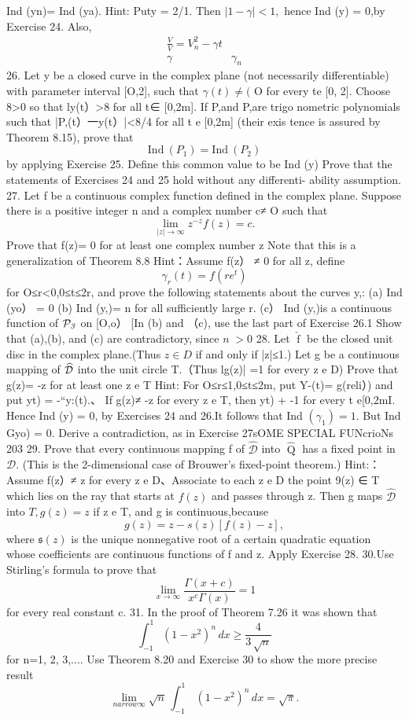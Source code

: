 Ind (yn)= Ind (ya). Hint: Puty = 2/1. Then $|1-\gamma|<1,$ hence Ind (y) = 0,by Exercise 24. Also, $$ \begin{array}{l}{{\frac{V}{V}=V_{n}^{2}-\gamma t}}\\ {{\gamma}}&{{\gamma_{n}}}\end{array} $$ 26. Let y be a closed curve in the complex plane (not necessarily differentiable) with parameter interval [O,2], such that $\gamma(t)\neq($ O for every te [0, 2]. Choose 8>0 so that ly(t）>8 for all t∈ [0,2m]. If P,and P,are trigo nometric polynomials such that |P,(t）一y(t）|<8/4 for all t e [0,2m] (their exis tence is assured by Theorem 8.15), prove that $$ {\mathrm{Ind~}}(P_{1})={\mathrm{Ind~}}(P_{2}) $$ by applying Exercise 25. Define this common value to be Ind (y) Prove that the statements of Exercises 24 and 25 hold without any differenti- ability assumption. 27. Let f be a continuous complex function defined in the complex plane. Suppose there is a positive integer n and a complex number c≠ O such that $$ \operatorname*{lim}_{|z|\to\infty}z^{-z}f(z)=c. $$ Prove that f(z)= 0 for at least one complex number z Note that this is a generalization of Theorem 8.8 Hint：Assume f(z） ≠ 0 for all z, define $$ \gamma_{r}(t)=f(r e^{t}) $$ for O≤r<0,0≤t≤2r, and prove the following statements about the curves y,: (a) Ind (yo） = 0 (b) Ind (y,)= n for all sufficiently large r. (c） Ind (y,)is a continuous function of ${\mathcal{P}}_{\it3}$ on [O,o） [In (b) and （c), use the last part of Exercise 26.1 Show that (a),(b), and (c) are contradictory, since $\scriptstyle n\;>0$ 28. Let ${\widehat{\operatorname{f}}}$ be the closed unit disc in the complex plane.(Thus $\scriptstyle z\in D$ if and only if |z|≤1.) Let g be a continuous mapping of $\widehat{\cal D}$ into the unit circle T.（Thus lg(z)| =1 for every z e D) Prove that g(z)= -z for at least one z e T Hint: For O≤r≤1,0≤t≤2m, put Y-(t)= g(reli）) and put yt) = -“y:(t).、 If g(z)≠ -z for every z e T, then yt) + -1 for every t e[0,2mI. Hence Ind (y) = 0, by Exercises 24 and 26.It follows that Ind $(\gamma_{1})=1.$ But Ind Gyo) = 0. Derive a contradiction, as in Exercise 27sOME SPECIAL FUNcrioNs 203 29. Prove that every continuous mapping f of $\widehat{\mathcal{D}}$ into ${\widehat{\operatorname{Q}}}$ has a fixed point in ${\mathcal{D}}.$ (This is the 2-dimensional case of Brouwer's fixed-point theorem.) Hint:： Assume f(z）≠ z for every z e D、Associate to each z e D the point 9(z) ∈ T which lies on the ray that starts at $f(z)$ and passes through z. Then g maps ${\widehat{\mathcal{D}}}$ into $T,g(z)=z$ if z e T, and g is continuous,because $$ g(z)=z-s(z)[f(z)-z], $$ where ${\mathfrak{s}}(z)$ is the unique nonnegative root of a certain quadratic equation whose coefficients are continuous functions of f and z. Apply Exercise 28. 30.Use Stirling's formula to prove that $$ \operatorname*{lim}_{x\to\infty}{\frac{\Gamma(x+c)}{x^{c}\Gamma(x)}}=1 $$ for every real constant c. 31. In the proof of Theorem 7.26 it was shown that $$ \textstyle\int_{-1}^{1}(1-x^{2})^{n}\,d x\geq{\frac{4}{3\,\sqrt{n}}} $$ for n=1, 2, 3,.... Use Theorem 8.20 and Exercise 30 to show the more precise result $$ \operatorname*{lim}_{n arrow\infty}\sqrt{n}\,\int_{-1}^{1}\,(1-x^{2})^{n}\,d x=\sqrt{\pi}. $$